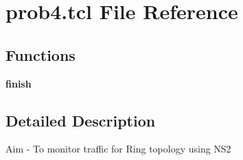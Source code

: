 \hypertarget{prob4_8tcl}{}\section{prob4.\+tcl File Reference}
\label{prob4_8tcl}
\subsection*{Functions}
\begin{DoxyCompactItemize}
\item 
\mbox{\label{prob4_8tcl_a30728837c246b65ef76298af0101d99c}} 
{\bfseries finish}
\end{DoxyCompactItemize}


\subsection{Detailed Description}
Aim -\/ To monitor traffic for Ring topology using N\+S2

\begin{DoxyVerb}
\end{DoxyVerb}
